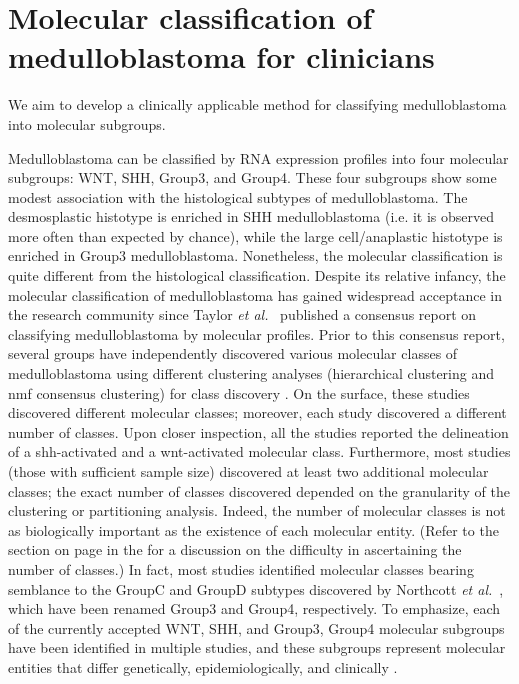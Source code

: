 \chapter{Molecular classification of medulloblastoma for clinicians}
\label{ch:mb-class}

\begin{objective}
We aim to develop a clinically applicable method for classifying medulloblastoma into molecular subgroups.
\end{objective}

Medulloblastoma can be classified by RNA expression profiles into four molecular subgroups: WNT, SHH, Group3, and Group4. These four subgroups show some modest association with the histological subtypes of medulloblastoma. The desmosplastic histotype is enriched in SHH medulloblastoma (i.e. it is observed more often than expected by chance), while the large cell/anaplastic histotype is enriched in Group3 medulloblastoma. Nonetheless, the molecular classification is quite different from the histological classification. Despite its relative infancy, the molecular classification of medulloblastoma has gained widespread acceptance in the research community since Taylor \emph{et al.}\  published a consensus report on classifying medulloblastoma by molecular profiles. Prior to this consensus report, several groups have independently discovered various molecular classes of medulloblastoma using different clustering analyses (hierarchical clustering and \gls{nmf} consensus clustering) for class discovery . On the surface, these studies discovered different molecular classes; moreover, each study discovered a different number of classes. Upon closer inspection, all the studies reported the delineation of a \gls{shh}-activated and a \gls{wnt}-activated molecular class. Furthermore, most studies (those with sufficient sample size) discovered at least two additional molecular classes; the exact number of classes discovered depended on the granularity of the clustering or partitioning analysis. Indeed, the number of molecular classes is not as biologically important as the existence of each molecular entity. (Refer to the  section on page \pageref{sec:classification} in the  for a discussion on the difficulty in ascertaining the number of classes.) In fact, most studies identified molecular classes bearing semblance to the GroupC and GroupD subtypes discovered by Northcott \emph{et al.}\ , which have been renamed Group3 and Group4, respectively. To emphasize, each of the currently accepted WNT, SHH, and Group3, Group4 molecular subgroups have been identified in multiple studies, and these subgroups represent molecular entities that differ genetically, epidemiologically, and clinically .


